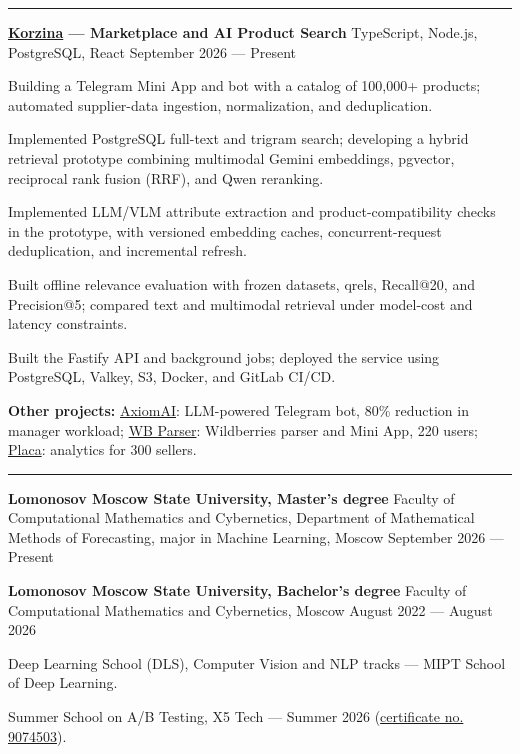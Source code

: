 \documentclass[10pt,a4paper]{article}
\newcommand{\cvsection}[1]{%
  \vspace{5pt}{\large\bfseries #1}\par\vspace{2pt}\hrule\vspace{4pt}}
\newcommand{\cventry}[3]{%
  \textbf{#1} \textbar{} #3 \textbar{} #2\par\vspace{1pt}}
\begin{document}
\cvsection{Projects}
\cventry{\href{https://github.com/noobmaster-ru/korzina-market}{Korzina} --- Marketplace and AI Product Search}{September 2026 --- Present}{TypeScript, Node.js, PostgreSQL, React}
\begin{cvitems}
    \item Building a Telegram Mini App and bot with a catalog of 100,000+ products; automated supplier-data ingestion, normalization, and deduplication.
    \item Implemented PostgreSQL full-text and trigram search; developing a hybrid retrieval prototype combining multimodal Gemini embeddings, pgvector, reciprocal rank fusion (RRF), and Qwen reranking.
    \item Implemented LLM/VLM attribute extraction and product-compatibility checks in the prototype, with versioned embedding caches, concurrent-request deduplication, and incremental refresh.
    \item Built offline relevance evaluation with frozen datasets, qrels, Recall@20, and Precision@5; compared text and multimodal retrieval under model-cost and latency constraints.
    \item Built the Fastify API and background jobs; deployed the service using PostgreSQL, Valkey, S3, Docker, and GitLab CI/CD.
\end{cvitems}
\textbf{Other projects:} \href{https://github.com/noobmaster-ru/axiomai}{AxiomAI}: LLM-powered Telegram bot, 80\% reduction in manager workload; \href{https://github.com/noobmaster-ru/tg-mini-app-backend}{WB Parser}: Wildberries parser and Mini App, 220 users; \href{https://github.com/noobmaster-ru/wb_tables}{Placa}: analytics for 300 sellers.\par

\cvsection{Education}
\cventry{Lomonosov Moscow State University, Master's degree}{September 2026 --- Present}{Faculty of Computational Mathematics and Cybernetics, Department of Mathematical Methods of Forecasting, major in Machine Learning, Moscow}
\vspace{2pt}
\cventry{Lomonosov Moscow State University, Bachelor's degree}{August 2022 --- August 2026}{Faculty of Computational Mathematics and Cybernetics, Moscow}
\begin{cvitems}
    \item Deep Learning School (DLS), Computer Vision and NLP tracks --- MIPT School of Deep Learning.
    \item Summer School on A/B Testing, X5 Tech --- Summer 2026 (\href{https://drive.google.com/file/d/1mUnPwkYkO6VxMJelwePo0Ie6PKA6IBot/view?usp=sharing}{certificate no. 9074503}).
\end{cvitems}
\end{document}
